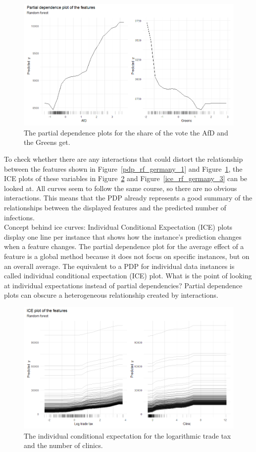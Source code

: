 \begin{figure}[H]
  \centering
  \includegraphics[width = \textwidth]{pdp_rf_germany_3.png}
  \caption{The partial dependence plots for the share of the vote the AfD and the Greens get.}
  \label{pdp_rf_germany_3}
\end{figure}
To check whether there are any interactions that could distort the relationship between the features shown in Figure~\ref{pdp_rf_germany_1} and Figure~\ref{pdp_rf_germany_3}, the ICE plots of these variables in Figure~\ref{ice_rf_germany_1} and Figure~\ref{ice_rf_germany_3} can be looked at. All curves seem to follow the same course, so there are no obvious interactions. This means that the PDP already represents a good summary of the relationships between the displayed features and the predicted number of infections. \\
Concept behind ice curves: Individual Conditional Expectation (ICE) plots display one line per instance that shows how the instance's prediction changes when a feature changes. The partial dependence plot for the average effect of a feature is a global method because it does not focus on specific instances, but on an overall average. The equivalent to a PDP for individual data instances is called individual conditional expectation (ICE) plot. What is the point of looking at individual expectations instead of partial dependencies? Partial dependence plots can obscure a heterogeneous relationship created by interactions.
\begin{figure}[H]
  \centering
  \includegraphics[width = \textwidth]{ice_rf_germany_1.png}
  \caption{The individual conditional expectation for the logarithmic trade tax and the number of clinics.}
  \label{ice_rf_germany_1}
\end{figure}
